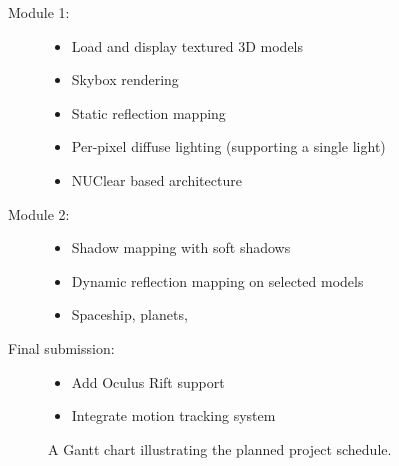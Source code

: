 \documentclass[11pt]{scrartcl} %
\begin{document}
\begin{description}
    \item[Module 1:]
        \begin{itemize}
            \item Load and display textured 3D models
            \item Skybox rendering
            \item Static reflection mapping
            \item Per-pixel diffuse lighting (supporting a single light)
            \item NUClear based architecture
        \end{itemize}
    \item[Module 2:]
        \begin{itemize}
            \item Shadow mapping with soft shadows
            \item Dynamic reflection mapping on selected models
            \item Spaceship, planets,
        \end{itemize}
    \item[Final submission:]
        \begin{itemize}
            \item Add Oculus Rift support
            \item Integrate motion tracking system
        \end{itemize}
\end{description}

\begin{figure}
    \makebox[\textwidth][c]{\resizebox{0.95\paperwidth}{!}{}}
    \caption[Project Schedule]{A Gantt chart illustrating the planned project schedule.}
    \label{gantt:schedule}
\end{figure}
\end{document}
